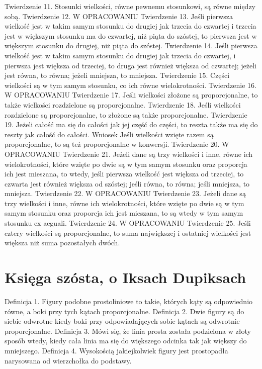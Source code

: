 Twierdzenie 11.
    Stosunki wielkości, równe pewnemu stosunkowi, są równe między sobą.
Twierdzenie 12.
W OPRACOWANIU
Twierdzenie 13.
    Jeśli pierwsza wielkość jest w takim samym stosunku do drugiej jak trzecia do czwartej i trzecia jest w większym stosunku ma do czwartej, niż piąta do szóstej, to pierwsza jest w większym stosunku do drugiej, niż piąta do szóstej.
Twierdzenie 14.
    Jeśli pierwsza wielkość jest w takim samym stosunku do drugiej jak trzecia do czwartej, i pierwsza jest większa od trzeciej, to druga jest również większa od czwartej; jeżeli jest równa, to równa; jeżeli mniejsza, to mniejsza.
Twierdzenie 15.
    Części wielkości są w tym samym stosunku, co ich równe wielokrotności.
Twierdzenie 16.
W OPRACOWANIU
Twierdzenie 17.
    Jeśli wielkości złożone są proporcjonalne, to także wielkości rozdzielone są proporcjonalne.
Twierdzenie 18.
    Jeśli wielkości rozdzielone są proporcjonalne, to złożone są także proporcjonalne.
Twierdzenie 19.
    Jeżeli całość ma się do całości jak jej część do części, to reszta także ma się do reszty jak całość do całości. Wniosek
    Jeśli wielkości wzięte razem są proporcjonalne, to są też proporcjonalne w konwersji.
Twierdzenie 20.
W OPRACOWANIU
Twierdzenie 21.
    Jeżeli dane są trzy wielkości i inne, równe ich wielokrotności, które wzięte po dwie są w tym samym stosunku oraz proporcja ich jest mieszana, to wtedy, jeśli pierwsza wielkość jest większa od trzeciej, to czwarta jest również większa od szóstej; jeśli równa, to równa; jeśli mniejsza, to mniejsza.
Twierdzenie 22.
W OPRACOWANIU
Twierdzenie 23.
    Jeżeli dane są trzy wielkości i inne, równe ich wielokrotności, które wzięte po dwie są w tym samym stosunku oraz proporcja ich jest mieszana, to są wtedy w tym samym stosunku ex aeguali.
Twierdzenie 24.
W OPRACOWANIU
Twierdzenie 25.
    Jeśli cztery wielkości są proporcjonalne, to suma największej i ostatniej wielkości jest większa niż suma pozostałych dwóch. 



\section{Księga szósta, o Iksach Dupiksach}

Definicja 1.
    Figury podobne prostoliniowe to takie, których kąty są odpowiednio równe, a boki przy tych kątach proporcjonalne.
Definicja 2.
    Dwie figury są do siebie odwrotne kiedy boki przy odpowiadających sobie kątach są odwrotnie proporcjonalne.
Definicja 3.
    Mówi się, że linia prosta została podzielona w złoty sposób wtedy, kiedy cała linia ma się do większego odcinka tak jak większy do mniejszego.
Definicja 4.
    Wysokością jakiejkolwiek figury jest prostopadła narysowana od wierzchołka do podstawy.


